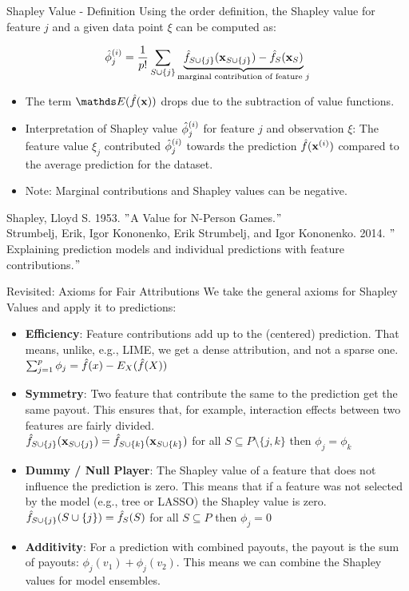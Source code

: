\documentclass[11pt,compress,t,notes=noshow, aspectratio=169, xcolor=table]{beamer}
\begin{document}
\begin{vbframe}{Shapley Value - Definition}
  Using the order definition, the Shapley value for feature $j$ and a given data point $\xi$ can be computed as:

     $$ \phiij  = \frac{1}{p!} \sum_{\Scupj} \underbrace{\fh_{\Scupj}(\xv_{\Scupj}) - \fh_{S}(\xv_{S})}_{\text{marginal contribution of feature $j$}} $$
\begin{itemize}
    \item The term $\E(\fh(\xv))$ drops due to the subtraction of value functions.
  \item Interpretation of Shapley value $\phiij$ for feature $j$ and observation $\xi$:
  The feature value $\xi_j$ contributed $\phiij$ towards the prediction $\fh(\xi)$ compared to the average prediction for the dataset.
   \item Note: Marginal contributions and Shapley values can be negative.
\end{itemize}
\lz
\tiny
Shapley, Lloyd S. 1953. $"$A Value for N-Person Games.$"$\\
\vspace{0.2cm}
Strumbelj, Erik, Igor Kononenko, Erik Strumbelj, and Igor Kononenko. 2014. $"$Explaining prediction models and individual predictions with feature contributions.$"$

\end{vbframe}



\begin{vbframe}{Revisited: Axioms for Fair Attributions}
  We take the general axioms for Shapley Values and apply it to predictions:
  \vspace{0.25cm}
  \begin{itemize}
  \itemsep1em
    \item \textbf{Efficiency}: Feature contributions add up to the (centered) prediction. That means, unlike, e.g., LIME, we get a dense attribution, and not a sparse one.
      $\sum\nolimits_{j=1}^p\phi_j=\hat{f}(x)-E_X(\fh(X))$
    \item \textbf{Symmetry}: Two feature that contribute the same to the prediction get the same payout. This ensures that, for example, interaction effects between two features are fairly divided. \\
      $\fh_{S\cup\{j\}}(\xv_{\Scupj}) = \fh_{\Scupk}(\xv_{\Scupk})$ for all $S \subseteq P\setminus\{j,k\}$ then $\phi_j=\phi_k$
    \item \textbf{Dummy / Null Player}: The Shapley value of a feature that does not influence the prediction is zero. This means that if a feature was not selected by the model (e.g., tree or LASSO) the Shapley value is zero.  \\
      $\fh_{\Scupj}(\Scupj)=\fhS(S)$ for all $S \subseteq P$ then $\phi_j=0$
    \item \textbf{Additivity}:  For a prediction with combined payouts, the
      payout is the sum of payouts: $\phi_j(v_1) + \phi_j(v_2)$. This means we can combine the Shapley values for model ensembles.
  \end{itemize}
\end{vbframe}
\end{document}
